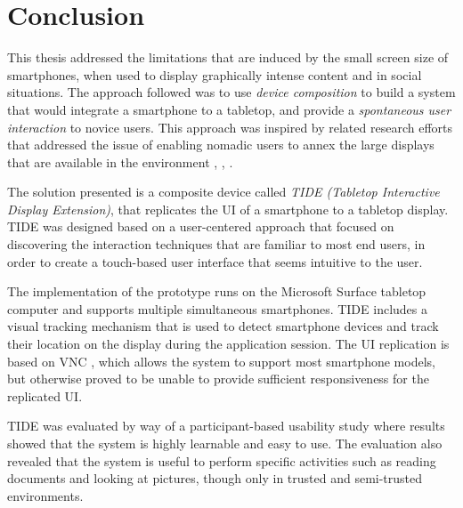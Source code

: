 \chapter{Conclusion}
\label{conclusion}

This thesis addressed the limitations that are induced by the small screen size of smartphones, when used to display graphically intense content and in social situations.
The approach followed was to use \emph{device composition} to build a system that would integrate a smartphone to a tabletop, and provide a \emph{spontaneous user interaction} to novice users.
This approach was inspired by related research efforts that addressed the issue of enabling nomadic users to annex the large displays that are available in the environment \citep{Want:2002:personalserver}, \citep{Arthur:2011:xice}, \citep{Baur:2012:virtualprojection}.

The solution presented is a composite device called \emph{TIDE (Tabletop Interactive Display Extension)}, that replicates the UI of a smartphone to a tabletop display.
TIDE was designed based on a user-centered approach that focused on discovering the interaction techniques that are familiar to most end users, in order to create a touch-based user interface that seems intuitive to the user.

The implementation of the prototype runs on the Microsoft Surface tabletop computer and supports multiple simultaneous smartphones.
TIDE includes a visual tracking mechanism that is used to detect smartphone devices and track their location on the display during the application session.
The UI replication is based on VNC \citep{Richardson:1998:vnc}, which allows the system to support most smartphone models, but otherwise proved to be unable to provide sufficient responsiveness for the replicated UI.

TIDE was evaluated by way of a participant-based usability study where results showed that the system is highly learnable and easy to use.
The evaluation also revealed that the system is useful to perform specific activities such as reading documents and looking at pictures, though only in trusted and semi-trusted environments.



